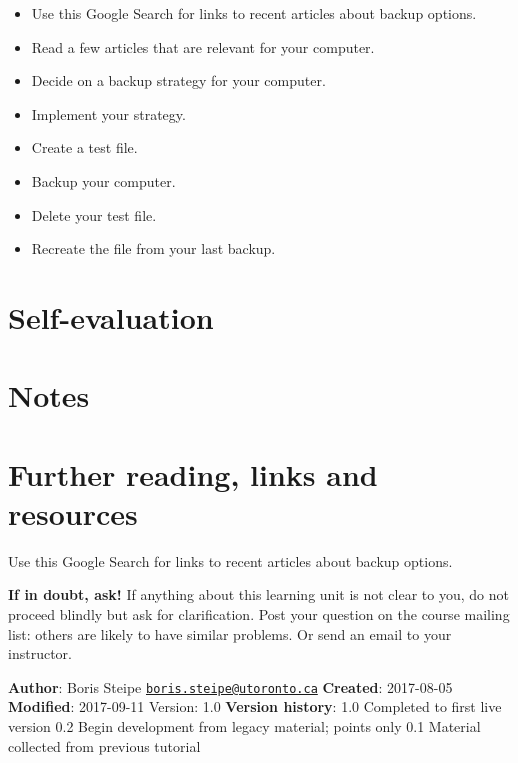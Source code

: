 \documentclass[]{book}
\providecommand{\tightlist}{%
  \setlength{\itemsep}{0pt}\setlength{\parskip}{0pt}}
\let\BeginKnitrBlock\begin \let\EndKnitrBlock\end
\begin{document}
\begin{rmd-task}
\begin{itemize}
\tightlist
\item
  Use this Google Search for links to recent articles about backup
  options.
\item
  Read a few articles that are relevant for your computer.
\item
  Decide on a backup strategy for your computer.
\item
  Implement your strategy.
\item
  Create a test file.
\item
  Backup your computer.
\item
  Delete your test file.
\item
  Recreate the file from your last backup.
\end{itemize}
\end{rmd-task}

\section{Self-evaluation}\label{self-evaluation-2}

\section{Notes}\label{notes}

\section{Further reading, links and
resources}\label{further-reading-links-and-resources-4}

Use this Google Search for links to recent articles about backup
options.

\textbf{If in doubt, ask!} If anything about this learning unit is not
clear to you, do not proceed blindly but ask for clarification. Post
your question on the course mailing list: others are likely to have
similar problems. Or send an email to your instructor.

\BeginKnitrBlock{rmd-original-history}
\textbf{Author}: Boris Steipe
\href{mailto:boris.steipe@utoronto.ca}{\nolinkurl{boris.steipe@utoronto.ca}}
\textbf{Created}: 2017-08-05 \textbf{Modified}: 2017-09-11 Version: 1.0
\textbf{Version history}: 1.0 Completed to first live version 0.2 Begin
development from legacy material; points only 0.1 Material collected
from previous tutorial
\EndKnitrBlock{rmd-original-history}
\end{document}

